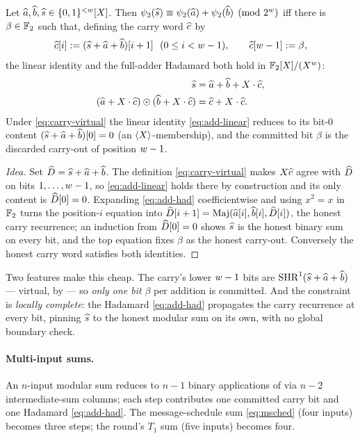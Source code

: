 \begin{lemma}
\label{lem:binius}
Let $\widehat{a},\widehat{b},\widehat{s}\in\{0,1\}^{<w}[X]$. Then $\psi_2(\widehat{s})\equiv
\psi_2(\widehat{a})+\psi_2(\widehat{b})\pmod{2^{w}}$ iff there is $\beta\in\mathbb{F}_2$
such that, defining the carry word $\widehat{c}$ by
\begin{equation}
  \label{eq:carry-virtual}
  \widehat{c}[i] := (\widehat{s}+\widehat{a}+\widehat{b})[i+1] \ \ (0\le i<w-1),
  \qquad \widehat{c}[w-1] := \beta,
\end{equation}
the linear identity and the full-adder Hadamard both hold in $\mathbb{F}_2[X]/(X^{w})$:
\begin{align}
  \widehat{s} &= \widehat{a}+\widehat{b}+X\cdot\widehat{c}, \label{eq:add-linear}\\
  (\widehat{a}+X\cdot\widehat{c})\odot(\widehat{b}+X\cdot\widehat{c}) &= \widehat{c}+X\cdot\widehat{c}.
  \label{eq:add-had}
\end{align}
Under \eqref{eq:carry-virtual} the linear identity \eqref{eq:add-linear}
reduces to its bit-$0$ content $(\widehat{s}+\widehat{a}+\widehat{b})[0]=0$ (an
$\langle X \rangle$-membership), and the committed bit $\beta$ is the discarded
carry-out of position $w-1$.
\end{lemma}

\begin{proof}[Idea]
Set $\widehat{D} = \widehat{s}+\widehat{a}+\widehat{b}$. The definition \eqref{eq:carry-virtual}
makes $X\widehat{c}$ agree with $\widehat{D}$ on bits $1,\dots,w-1$, so
\eqref{eq:add-linear} holds there by construction and its only content is
$\widehat{D}[0]=0$. Expanding \eqref{eq:add-had} coefficientwise and using $x^2 = x$
in $\mathbb{F}_2$ turns the position-$i$ equation into
$\widehat{D}[i+1] = \operatorname{Maj}(\widehat{a}[i],\widehat{b}[i],\widehat{D}[i])$, the honest carry recurrence;
an induction from $\widehat{D}[0]=0$ shows $\widehat{s}$ is the honest binary sum on every
bit, and the top equation fixes $\beta$ as the honest carry-out. Conversely the
honest carry word satisfies both identities.
\end{proof}

Two features make this cheap. The carry's lower $w-1$ bits are
$\operatorname{SHR}^{1}(\widehat{s}+\widehat{a}+\widehat{b})$ --- virtual, by  --- so
\emph{only one bit} $\beta$ per addition is committed. And the constraint is
\emph{locally complete}: the Hadamard \eqref{eq:add-had} propagates the carry
recurrence at every bit, pinning $\widehat{s}$ to the honest modular sum on its own,
with no global boundary check.

\paragraph{Multi-input sums.} An $n$-input modular sum reduces to $n-1$ binary
applications of  via $n-2$ intermediate-sum columns; each step
contributes one committed carry bit and one Hadamard \eqref{eq:add-had}. The
message-schedule sum \eqref{eq:msched} (four inputs) becomes three steps; the
round's $T_1$ sum (five inputs) becomes four.


